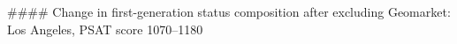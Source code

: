 #### Change in first-generation status composition after excluding Geomarket: Los Angeles, PSAT score 1070–1180
